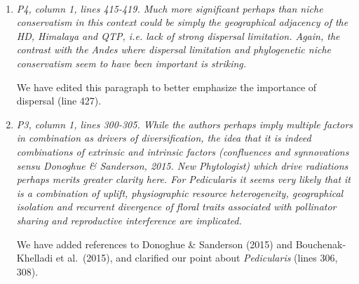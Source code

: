 \documentclass[11pt]{letter}
\begin{document}
\begin{letter}{ \\

}
\begin{enumerate}
  Thank you for this correction, this is clearly stated in Simon et
  al. We have replaced ``colonization'' with ``in situ adaptation''
  (line 405).

  \textit{Furthermore, it is also wrong to suggest that there is
    limited in situ diversification of Cerrado lineages. There are
    several well-documented examples of clades in the Cerrado that
    show accelerated rates of in situ species diversification
    generating clades of up to 50 or more species, especially in the
    higher campos rupestres habitats embedded within the Cerrado
    s.l. (see e.g. Mimosa Koenen et al 2013 S Afr J Bot; Calliandra de
    Souza et al 2014 Taxon 62: 1201-1220; Chamaecrista Rando et al
    2016 Int J Plant Sci 177: 3-17).}

  We have revised the section to include this point and references
  (line 407).

\item \textit{P4, column 1, lines 415-419. Much more significant
    perhaps than niche conservatism in this context could be simply
    the geographical adjacency of the HD, Himalaya and QTP, i.e. lack
    of strong dispersal limitation. Again, the contrast with the Andes
    where dispersal limitation and phylogenetic niche conservatism
    seem to have been important is striking.}

  We have edited this paragraph to better emphasize the importance of
  dispersal (line 427).

\item \textit{P3, column 1, lines 300-305. While the authors perhaps
    imply multiple factors in combination as drivers of
    diversification, the idea that it is indeed combinations of
    extrinsic and intrinsic factors (confluences and synnovations
    sensu Donoghue \& Sanderson, 2015. New Phytologist) which drive
    radiations perhaps merits greater clarity here. For Pedicularis it
    seems very likely that it is a combination of uplift,
    physiographic resource heterogeneity, geographical isolation and
    recurrent divergence of floral traits associated with pollinator
    sharing and reproductive interference are implicated.}

  We have added references to Donoghue \& Sanderson (2015) and
  Bouchenak-Khelladi et al.\ (2015), and clarified our point about
  \textit{Pedicularis} (lines 306, 308).


\end{enumerate}
\end{letter}
\end{document}
